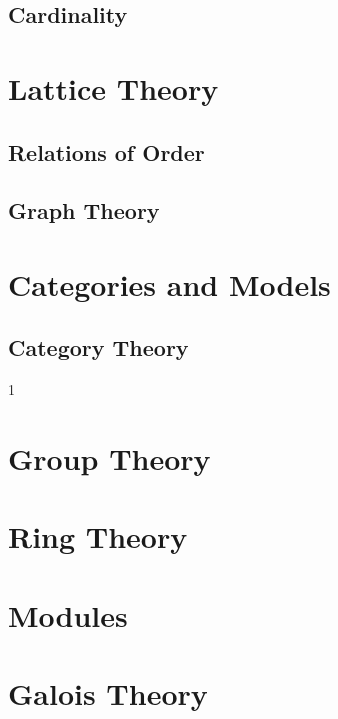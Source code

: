 \documentclass{book}                                                           %
\newcommand*{\TOPPATH}{books}
\newcommand*{\PATH}{\TOPPATH/}
\newcounter{endpage}
\def\compilealgebra{1}
\begin{document}
            \chapter{Cardinality}
                \label{chapt:Cardinality}%
        \part{Lattice Theory}
            \chapter{Relations of Order}
                \label{chapt:Relations_of_Order}%
            \chapter{Graph Theory}
                \label{chapt:Graph_Theory}%
        \part{Categories and Models}
            \chapter{Category Theory}
                \label{chapt:Category_Theory}%
    \fi
    \clearpage

    \setcounter{endpage}{\thepage}
    \label{book:Algebra}%
    \renewcommand{\PATH}{\TOPPATH/Algebra}
    \setcounter{page}{\value{endpage}}

    \if\compilealgebra1
        \part{Group Theory}
            
        \part{Ring Theory}
            
        \part{Modules}
        
        \part{Galois Theory}
            
\end{document}
